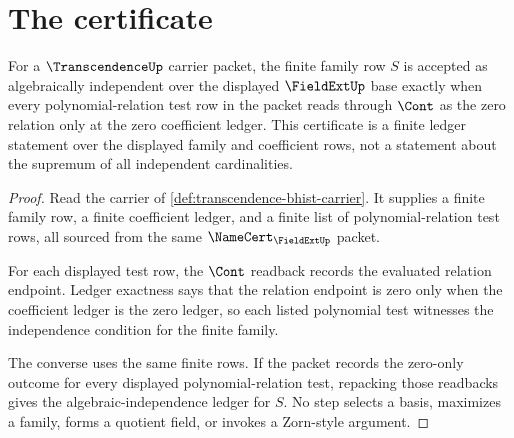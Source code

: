 \section{The certificate}
\label{sec:transcendence-certificate}

\begin{theorem}\label{thm:transcendence-algebraic-independence-ledger}
For a $\TranscendenceUp$ carrier packet, the finite family row $S$ is accepted
as algebraically independent over the displayed $\FieldExtUp$ base exactly when
every polynomial-relation test row in the packet reads through $\Cont$ as the
zero relation only at the zero coefficient ledger. This certificate is a finite
ledger statement over the displayed family and coefficient rows, not a statement
about the supremum of all independent cardinalities.
\end{theorem}
\begin{proof}
Read the carrier of
\autoref{def:transcendence-bhist-carrier}. It supplies a finite family row, a
finite coefficient ledger, and a finite list of polynomial-relation test rows,
all sourced from the same $\NameCert_{\FieldExtUp}$ packet.

For each displayed test row, the $\Cont$ readback records the evaluated
relation endpoint. Ledger exactness says that the relation endpoint is zero
only when the coefficient ledger is the zero ledger, so each listed polynomial
test witnesses the independence condition for the finite family.

The converse uses the same finite rows. If the packet records the zero-only
outcome for every displayed polynomial-relation test, repacking those readbacks
gives the algebraic-independence ledger for $S$. No step selects a basis,
maximizes a family, forms a quotient field, or invokes a Zorn-style argument.
\end{proof}

